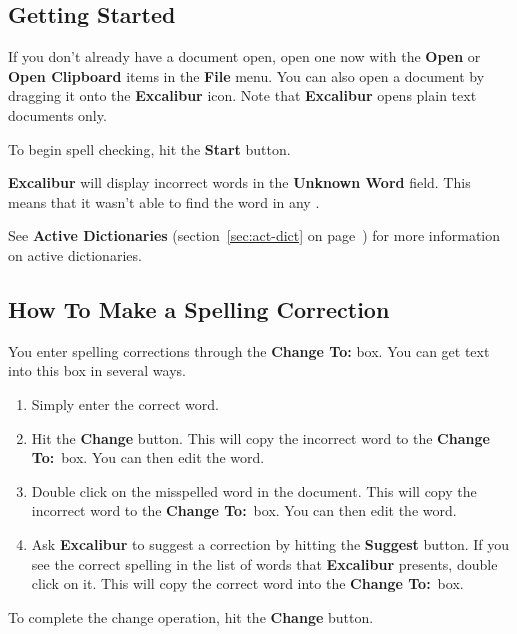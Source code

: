 \documentclass[11pt,titlepage]{article}
\newcommand{\ex}{\textbf{Excalibur}}
\begin{document}
\subsection{Getting Started}

If you don't already have a document open, open one now with the
\textbf{Open} or \textbf{Open Clipboard} items in the \textbf{File}
menu.  You can also open a document by dragging it onto the \ex{}
icon.  Note that \ex{} opens plain text documents only.

To begin spell checking, hit the \textbf{Start} button.

\ex{} will display incorrect words in the \textbf{Unknown Word} field.
This means that it wasn't able to find the word in any .
\begin{latexonly}
  See \textbf{Active Dictionaries} (section~\ref{sec:act-dict} on
  page~\pageref{sec:act-dict}) for more information on active
  dictionaries.
\end{latexonly}

\subsection{How To Make a Spelling Correction}

You enter spelling corrections through the \textbf{Change To:} box.
You can get text into this box in several ways.

\begin{enumerate}
\item Simply enter the correct word.

\item Hit the \textbf{Change} button. This will copy the incorrect
  word to the \textbf{Change To:}\ box. You can then edit the word.

\item Double click on the misspelled word in the document.  This will
  copy the incorrect word to the \textbf{Change To:}\ box.  You can
  then edit the word.

\item Ask \ex{} to suggest a correction by hitting the
  \textbf{Suggest} button. If you see the correct spelling in the list
  of words that \ex{} presents, double click on it. This will copy the
  correct word into the \textbf{Change To:}\ box.
\end{enumerate}

To complete the change operation, hit the \textbf{Change} button.
\end{document}
